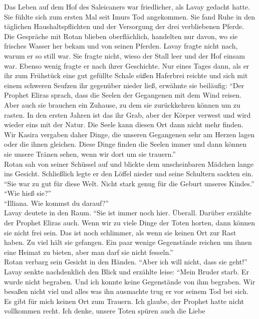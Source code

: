 Das Leben auf dem Hof des Saleicaners war friedlicher, als Lavay gedacht hatte. Sie fühlte sich zum 
ersten Mal seit Imurs Tod angekommen. Sie fand Ruhe in den täglichen Haushaltspflichten und der 
Versorgung der drei verbliebenen Pferde. Die Gespräche mit Rotan blieben oberflächlich, handelten 
nur davon, wo sie frisches Wasser her bekam und von seinen Pferden. Lavay fragte nicht nach, warum 
er so still war. Sie fragte nicht, wieso der Stall leer und der Hof einsam war. Ebenso wenig fragte 
er nach ihrer Geschichte. Nur eines Tages dann, als er ihr zum Frühstück eine gut gefüllte Schale 
süßen Haferbrei reichte und sich mit einem schweren Seufzen ihr gegenüber nieder ließ, erwähnte sie 
beiläufig: ``Der Prophet Eliras sprach, dass die Seelen der Gegangenen mit dem Wind reisen. Aber 
auch sie brauchen ein Zuhause, zu dem sie zurückkehren können um zu rasten. In den ersten Jahren 
ist das ihr Grab, aber der Körper verwest und wird wieder eins mit der Natur. Die Seele kann diesen 
Ort dann nicht mehr finden. Wir Kasira vergaben daher Dinge, die unseren Gegangenen sehr am Herzen 
lagen oder die ihnen gleichen. Diese Dinge finden die Seelen immer und dann können sie unsere 
Tränen sehen, wenn wir dort um sie trauern.''\\
Rotan sah von seiner Schüssel auf und blickte dem unscheinbaren Mädchen lange ins Gesicht. 
Schließlich legte er den Löffel nieder und seine Schultern sackten ein. ``Sie war zu gut für diese 
Welt. Nicht stark genug für die Geburt unseres Kindes.''\\
``Wie hieß sie?''\\
``Illiana. Wie kommst du darauf?''\\
Lavay deutete in den Raum. ``Sie ist immer noch hier. Überall. Darüber erzählte der Prophet Eliras 
auch. Wenn wir zu viele Dinge der Toten horten, dann können sie nicht frei sein. Das ist noch 
schlimmer, als wenn sie keinen Ort zur Rast haben. Zu viel hält sie gefangen. Ein paar wenige 
Gegenstände reichen um ihnen eine Heimat zu bieten, aber man darf sie nicht fesseln.''\\
Rotan verbarg sein Gesicht in den Händen. ``Aber ich will nicht, dass sie geht!''\\
Lavay senkte nachdenklich den Blick und erzählte leise: ``Mein Bruder starb. Er wurde nicht 
begraben. Und ich konnte keine Gegenstände von ihm begraben. Wir besaßen nicht viel und alles was 
ihn ausmachte trug er vor seinem Tod bei sich. Es gibt für mich keinen Ort zum Trauern. Ich 
glaube, der Prophet hatte nicht vollkommen recht. Ich denke, unsere Toten spüren auch die Liebe 
